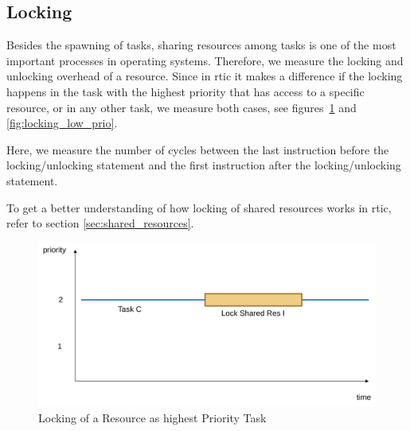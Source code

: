\subsection{Locking}

Besides the spawning of tasks, sharing resources among tasks is one of the most important processes in operating systems. Therefore, we measure the locking and unlocking overhead of a resource. Since in \gls{rtic} it makes a difference if the locking happens in the task with the highest priority that has access to a specific resource, or in any other task, we measure both cases, see figures~\ref{fig:locking_high_prio} and \ref{fig:locking_low_prio}.

Here, we measure the number of cycles between the last instruction before the locking/unlocking statement and the first instruction after the locking/unlocking statement.

To get a better understanding of how locking of shared resources works in \gls{rtic}, refer to section \ref{sec:shared_resources}.

\begin{figure}
  \centerfloat
  \includegraphics[width=\textwidth]{fig/locking_high_prio.svg.pdf}
  \caption{Locking of a Resource as highest Priority Task}%
  \label{fig:locking_high_prio}
\end{figure}

